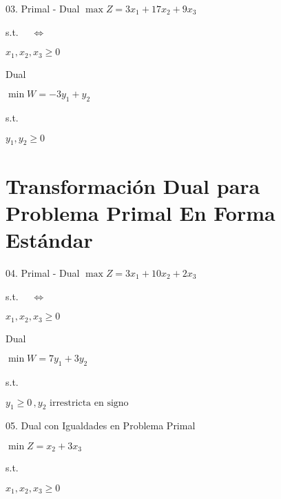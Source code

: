 \begin{frameExample}{03. Primal - Dual}{}
  $  \max Z = 3x_1+ 17x_2 + 9x_3 $
  
  s.t.
$\quad \Leftrightarrow \quad$ 

$x_1, x_2, x_3  \geq 0 $
\vspace{5mm}

\begin{block}{Dual}
  
  $\min W = -3y_1 + y_2 $

                  s.t.  %
  
  $    y_1, y_2  \geq 0 $
\end{block}
\end{frameExample}


\section{Transformación Dual para Problema Primal En Forma Estándar}
\label{sec:standard-form}


\begin{frameExample}{04. Primal - Dual}{}
   $  \max Z = 3x_1+ 10x_2 + 2x_3 $
  
  s.t. $\quad \Leftrightarrow \quad$

$x_1, x_2, x_3  \geq 0 $
\vspace{3mm}
\begin{block}{Dual}
  
  $\min W = 7y_1 + 3y_2 $

                  s.t.  %
  
  $    y_1\geq 0 \, , y_2 \text{ irrestricta en signo}$
\end{block}
\end{frameExample}


\begin{frameExample}{05. Dual con Igualdades en Problema Primal}
  
  $\min Z = x_2 + 3x_3$

  s.t.


  $x_1, x_2, x_3 \geq 0$
\end{frameExample}

